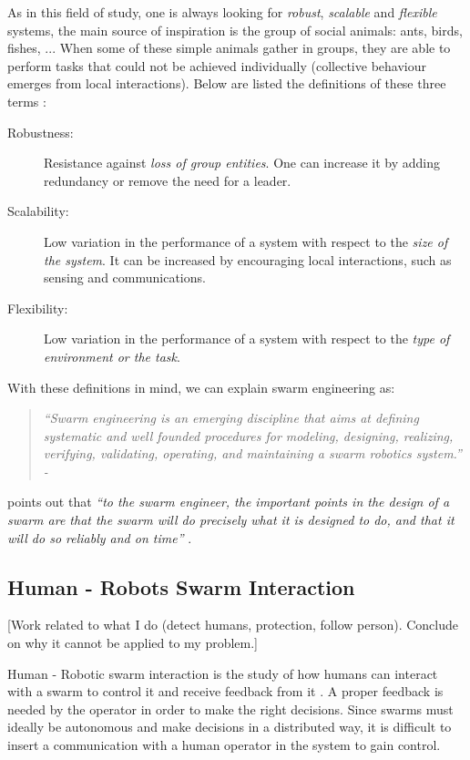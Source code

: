 \documentclass[oneside, a4paper, 12pt]{memoir}
\newcommand{\quoto}[2]{
\begin{quotation}
\textit{\enquote{#1} - #2}
\end{quotation}
}
\newcommand{\quot}[1]{\textit{\enquote{#1}}}
\begin{document}
As in this field of study, one is always looking for \emph{robust}, \emph{scalable} and \emph{flexible} systems, the main source of inspiration is the group of social animals: ants, birds, fishes, ... When some of these simple animals gather in groups, they are able to perform tasks that could not be achieved individually (collective behaviour emerges from local interactions). Below are listed the definitions of these three terms \citep{brambilla2013swarm}:

\label{def:robustness_scalability_flexibility}
\begin{description}
\item[Robustness:] Resistance against \emph{loss of group entities}. One can increase it by adding redundancy or remove the need for a leader.
\item[Scalability:] Low variation in the performance of a system with respect to the \emph{size of the system}. It can be increased by encouraging local interactions, such as sensing and communications.
\item[Flexibility:] Low variation in the performance of a system with respect to the \emph{type of environment or the task}.
\end{description}

With these definitions in mind, we can explain swarm engineering as:

\quoto{Swarm engineering is an emerging discipline that aims at defining systematic and well founded procedures for modeling, designing, realizing, verifying, validating, operating, and maintaining a swarm robotics system.}{\cite{brambilla2013swarm}}

\citet{kazadi2000swarm} points out that \quot{to the swarm engineer, the important points in the design of a swarm are that the swarm will do precisely what it is designed to do, and that it will do so reliably and on time} \citep{kazadi2000swarm}.
	
	\subsection{Human - Robots Swarm Interaction}
	
	[Work related to what I do (detect humans, protection, follow person). Conclude on why it cannot be applied to my problem.]
	
	Human - Robotic swarm interaction is the study of how humans can interact with a swarm to control it and receive feedback from it \citep{brambilla2013swarm}. A proper feedback is needed by the operator in order to make the right decisions. Since swarms must ideally be autonomous and make decisions in a distributed way, it is difficult to insert a communication with a human operator in the system to gain control.
	
\end{document}
